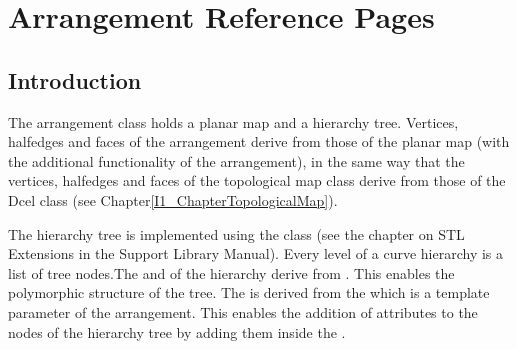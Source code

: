 


\clearpage
\section{Arrangement Reference Pages}

\subsection*{Introduction}

The arrangement class holds a planar map and a hierarchy tree.
Vertices, halfedges and faces of the arrangement derive from
those of the planar map (with the additional functionality of
the arrangement),
in the same way that the vertices, halfedges and faces of the topological map
class derive from those of the Dcel class
(see Chapter\ref{I1_ChapterTopologicalMap}).


The hierarchy tree is implemented using the 
class (see the chapter on STL Extensions in the Support Library Manual). Every level of a curve
hierarchy is a list of tree nodes.The  and 
 of 
the hierarchy derive from . This enables the
polymorphic structure of the tree. The  is
derived from the  which is a template parameter
of the arrangement. This enables the addition of attributes to the nodes
of the hierarchy tree by adding them inside the .



